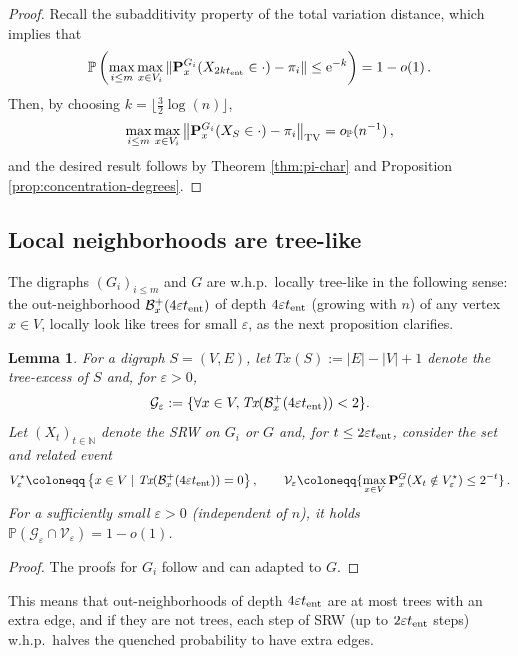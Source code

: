 \documentclass[11pt,oneside]{amsart}
\numberwithin{equation}{section}  %
\theoremstyle{plain}
\newtheorem{lemma}[theorem]{Lemma}
\newcommand{\whp}{{w.h.p.~}}
\newcommand{\N}{\mathbb{N}}
\newcommand{\eps}{\varepsilon}
\newcommand{\p}{\mathbb{P}}
\newcommand{\PP}{\mathbb{P}}
\newcommand{\op}{o_{\p}}
\newcommand{\tent}{t_{\textup{ent}}}
\newcommand{\quenchG}{\mathbf{P}^G}
\newcommand{\quench}{\mathbf{P}}
\newcommand{\veps}{V^{\star}_\eps}
\newcommand{\trex}{\textit{Tx}}
\begin{document}
\begin{proof}
	Recall the subadditivity  property of the total variation distance, which implies that
	\begin{equation}
		\PP\left(\max_{i \le m}\max_{x \in V_i}\|\quench^{G_i}_x(X_{2k\tent}\in \cdot)-\pi_i\|\le {\rm e}^{-k}\right)=1-o(1)\,.
	\end{equation}
	Then, by choosing $k=\lfloor\frac32\log(n)\rfloor$,
	\begin{equation} \label{fast-mixing-new}
		\max_{i \le m}\max_{x \in V_i}
		\left\|\quench^{G_i}_x(X_{S}\in \cdot)-\pi_i\right\|_{\rm TV} = \op(n^{-1}) \,,
	\end{equation}
	and the desired result follows by Theorem \ref{thm:pi-char} and Proposition \ref{prop:concentration-degrees}.
\end{proof}
\subsection{Local neighborhoods are tree-like}\label{suse:local-neigh}
The digraphs $(G_i)_{i \le m}$ and $G$ are \whp locally tree-like 
in the following sense: the out-neighborhood $\mathcal{B}^+_{x}({4\eps\tent})$ of depth ${4\eps\tent}$ (growing with $n$) of any vertex $x \in V$, locally look like trees for small $\eps$, as the next proposition clarifies.
	\begin{lemma}\label{lemma:tree-like}
	For a digraph $S=(V,E)$, let $\trex(S):= |E|-|V|+1$ denote the tree-excess of $S$ and, for $\eps>0$,
	\begin{equation} \label{eq:G+}  
			\mathcal{G}_\eps:=\{\forall x \in V,\trex(\mathcal{B}^+_x({4\eps\tent}))< 2 \}.
	\end{equation}
	Let $(X_t)_{t \in \N}$ denote the SRW on $G_i$ or $G$ and, for $t \le {2\eps\tent}$, consider the set and related event
	\begin{align} \label{eq:Veps}
		\veps \coloneqq \left\{ x \in V \mid \trex(\mathcal{B}^+_{x}({4\eps\tent}))=0 \right\}
		, \qquad
		\mathcal{V}_{\eps}\coloneqq \{\max_{x \in V} \quenchG_x(X_t \notin \veps)\le 2^{-t}\}\,.
	\end{align}
	For a sufficiently small $\eps>0$ (independent of $n$), it holds $\p\left(\mathcal{G}_\eps \cap  \mathcal{V}_{\eps}\right) = 1-o(1)$.
\end{lemma}
\begin{proof}
	The proofs for $G_i$ follow \cite[Lemmas 6 and 7]{BP} and can adapted to $G$. 
\end{proof}
This means that out-neighborhoods of depth ${4\eps\tent}$ are at most trees with an extra edge, and if they are not trees, each step of SRW (up to ${2\eps\tent}$ steps) \whp halves the quenched probability to have extra edges.
\end{document}
